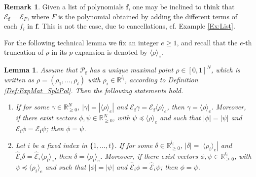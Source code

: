 \documentclass[12pt]{amsart}
\newtheorem{lemma}[theorem]{Lemma}
\theoremstyle{definition}
\newtheorem{remark}[theorem]{Remark}
\numberwithin{equation}{subsection}
\newcommand{\RR}{\mathbb{R}}
\newcommand{\SP}{\mathcal{P}}
\newcommand{\Bf}{\boldsymbol{f}}
\newcommand{\E}{\mathcal{E}}
\newcommand{\tE}{\operatorname{\widehat{\E}}}
\renewcommand{\!}[1]{{\color{red}\text{\Huge$\star$ }#1}}
\begin{document}
\begin{remark}
	Given a list of polynomials $\Bf$, one may be inclined to think that $\E_{\Bf}=\E_F$, where $F$ is the polynomial obtained by adding the different terms of each $f_i$ in $\Bf$. This is not the case, due to cancellations, cf. Example \ref{Ex:List}.
\end{remark}
For the following technical lemma we fix an integer $e\geq 1$, and recall that the $e$-th truncation of $\rho$ in its $p$-expansion is denoted by $\langle \rho \rangle_e$.

\begin{lemma}\label{equal-vector}
Assume that $\SP_{\Bf}$ has a unique maximal point $\rho\in [0,1]^N$, which is written as  $\rho=(\rho_1, \ldots, \rho_t)$ with $\rho_i \in \RR^{l_i}$, according to Definition \ref{Def:ExpMat_SpliPol}. Then the following statements hold.
\begin{enumerate}
\item If for some $\gamma \in \RR_{\geq 0}^N$, $|\gamma|=|\langle \rho \rangle_e|$ and $\E_{\Bf} \gamma = \E_{\Bf}  \langle \rho \rangle_e$,  then $ \gamma = \langle \rho \rangle_e $. Moreover, if 
there exist vectors $\phi, \psi \in \RR_{\geq 0}^{N}$, with $\psi \preceq \langle \rho \rangle_e$ and such that $|\phi|=|\psi|$ and  $\E_{\Bf} \phi = \E_{\Bf} \psi$;  then $\phi=\psi$.
\item Let $i$ be a fixed index in $\{1,\ldots,t\}$. If for some $\delta \in \RR_{\geq 0}^{l_i}$, $|\delta|=|\langle \rho_i \rangle_e|$ and $\tE_i \delta = \tE_i  \langle \rho_i \rangle_e$, then $ \delta = \langle \rho_i \rangle_e $. Moreover, if  there exist vectors $\phi, \psi  \in \RR_{\geq 0}^{l_i}$, with $\psi \preceq \langle \rho_i \rangle_e$ and such that $|\phi|=|\psi|$ and  $\tE_i \phi = \tE_i \psi$;  then $\phi=\psi$.
\end{enumerate}
\end{lemma}
\end{document}
